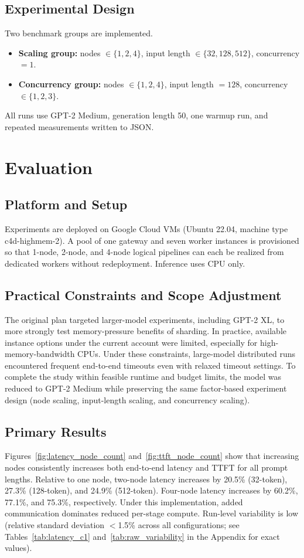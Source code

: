 \documentclass[conference]{IEEEtran}
\begin{document}
\subsection{Experimental Design}
Two benchmark groups are implemented.
\begin{itemize}
\item \textbf{Scaling group:} nodes \(\in\{1,2,4\}\), input length \(\in\{32,128,512\}\), concurrency \(=1\).
\item \textbf{Concurrency group:} nodes \(\in\{1,2,4\}\), input length \(=128\), concurrency \(\in\{1,2,3\}\).
\end{itemize}
All runs use GPT-2 Medium, generation length 50, one warmup run, and repeated measurements written to JSON.

\section{Evaluation}
\subsection{Platform and Setup}
Experiments are deployed on Google Cloud VMs (Ubuntu 22.04, machine type c4d-highmem-2). A pool of one gateway and seven worker instances is provisioned so that 1-node, 2-node, and 4-node logical pipelines can each be realized from dedicated workers without redeployment. Inference uses CPU only.

\subsection{Practical Constraints and Scope Adjustment}
The original plan targeted larger-model experiments, including GPT-2 XL, to more strongly test memory-pressure benefits of sharding. In practice, available instance options under the current account were limited, especially for high-memory-bandwidth CPUs. Under these constraints, large-model distributed runs encountered frequent end-to-end timeouts even with relaxed timeout settings. To complete the study within feasible runtime and budget limits, the model was reduced to GPT-2 Medium while preserving the same factor-based experiment design (node scaling, input-length scaling, and concurrency scaling).

\subsection{Primary Results}
Figures~\ref{fig:latency_node_count} and~\ref{fig:ttft_node_count} show that increasing nodes consistently increases both end-to-end latency and TTFT for all prompt lengths. Relative to one node, two-node latency increases by 20.5\% (32-token), 27.3\% (128-token), and 24.9\% (512-token). Four-node latency increases by 60.2\%, 77.1\%, and 75.3\%, respectively. Under this implementation, added communication dominates reduced per-stage compute. Run-level variability is low (relative standard deviation $<$1.5\% across all configurations; see Tables~\ref{tab:latency_c1} and~\ref{tab:raw_variability} in the Appendix for exact values).
\end{document}
